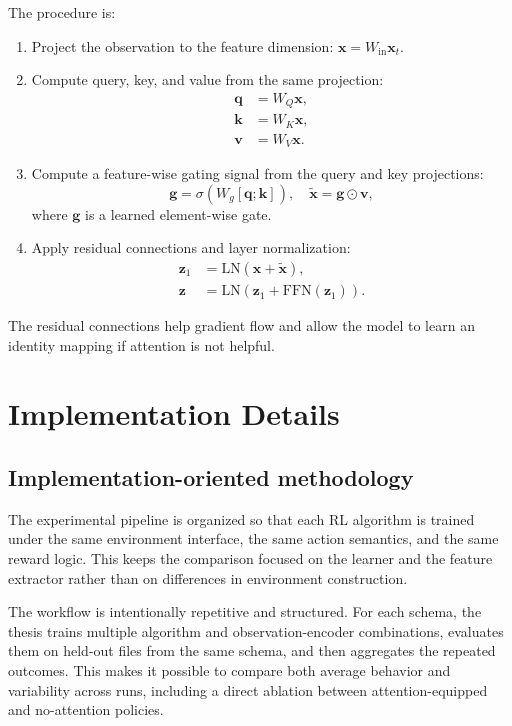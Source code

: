 \documentclass[12pt,oneside]{book}
\begin{document}
The procedure is:
\begin{enumerate}
\item Project the observation to the feature dimension: $\mathbf{x} = W_{\text{in}} \mathbf{x}_t$.
\item Compute query, key, and value from the same projection:
\begin{align}
\mathbf{q} &= W_Q \mathbf{x},\\
\mathbf{k} &= W_K \mathbf{x},\\
\mathbf{v} &= W_V \mathbf{x}.
\end{align}
\item Compute a feature-wise gating signal from the query and key projections:
\begin{equation}
\mathbf{g} = \sigma\!\left(W_g[\mathbf{q};\mathbf{k}]\right), \quad \tilde{\mathbf{x}} = \mathbf{g}\odot \mathbf{v},
\end{equation}
where $\mathbf{g}$ is a learned element-wise gate.
\item Apply residual connections and layer normalization:
\begin{align}
\mathbf{z}_1 &= \mathrm{LN}(\mathbf{x} + \tilde{\mathbf{x}}),\\
\mathbf{z} &= \mathrm{LN}(\mathbf{z}_1 + \mathrm{FFN}(\mathbf{z}_1)).
\end{align}
\end{enumerate}

The residual connections help gradient flow and allow the model to learn an identity mapping if attention is not helpful.

\chapter{Implementation Details}\label{ch:implementation}

\section{Implementation-oriented methodology}\label{sec:implementation-autorl}
The experimental pipeline is organized so that each RL algorithm is trained under the same environment interface, the same action semantics, and the same reward logic. This keeps the comparison focused on the learner and the feature extractor rather than on differences in environment construction.

The workflow is intentionally repetitive and structured. For each schema, the thesis trains multiple algorithm and observation-encoder combinations, evaluates them on held-out files from the same schema, and then aggregates the repeated outcomes. This makes it possible to compare both average behavior and variability across runs, including a direct ablation between attention-equipped and no-attention policies.
\end{document}
